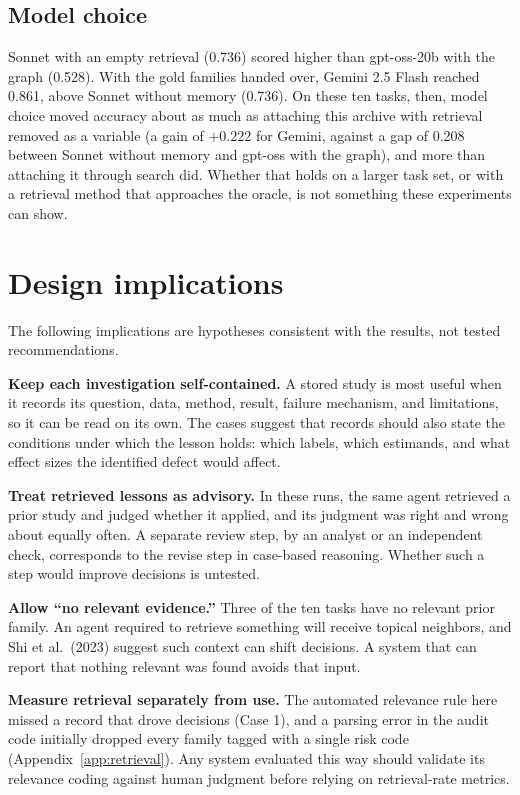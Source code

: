 \documentclass[11pt]{article}
\begin{document}
\subsection{Model choice}

Sonnet with an empty retrieval (0.736) scored higher than gpt-oss-20b with the graph (0.528). With the gold families handed over, Gemini 2.5 Flash reached 0.861, above Sonnet without memory (0.736). On these ten tasks, then, model choice moved accuracy about as much as attaching this archive with retrieval removed as a variable (a gain of $+0.222$ for Gemini, against a gap of 0.208 between Sonnet without memory and gpt-oss with the graph), and more than attaching it through search did. Whether that holds on a larger task set, or with a retrieval method that approaches the oracle, is not something these experiments can show.

\section{Design implications}
\label{sec:practical}

The following implications are hypotheses consistent with the results, not tested recommendations.

\textbf{Keep each investigation self-contained.} A stored study is most useful when it records its question, data, method, result, failure mechanism, and limitations, so it can be read on its own. The cases suggest that records should also state the conditions under which the lesson holds: which labels, which estimands, and what effect sizes the identified defect would affect.

\textbf{Treat retrieved lessons as advisory.} In these runs, the same agent retrieved a prior study and judged whether it applied, and its judgment was right and wrong about equally often. A separate review step, by an analyst or an independent check, corresponds to the revise step in case-based reasoning. Whether such a step would improve decisions is untested.

\textbf{Allow ``no relevant evidence.''} Three of the ten tasks have no relevant prior family. An agent required to retrieve something will receive topical neighbors, and Shi et al.\ (2023) suggest such context can shift decisions. A system that can report that nothing relevant was found avoids that input.

\textbf{Measure retrieval separately from use.} The automated relevance rule here missed a record that drove decisions (Case 1), and a parsing error in the audit code initially dropped every family tagged with a single risk code (Appendix~\ref{app:retrieval}). Any system evaluated this way should validate its relevance coding against human judgment before relying on retrieval-rate metrics.
\end{document}

